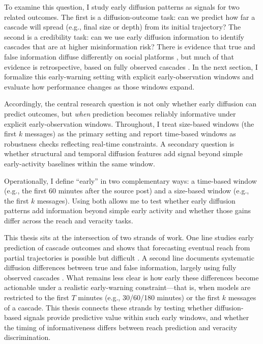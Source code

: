To examine this question, I study early diffusion patterns as signals for two related outcomes. The first is a diffusion-outcome task: can we predict how far a cascade will spread (e.g., final size or depth) from its initial trajectory? The second is a credibility task: can we use early diffusion information to identify cascades that are at higher misinformation risk? There is evidence that true and false information diffuse differently on social platforms \citep{vosoughi_spread_2018}, but much of that evidence is retrospective, based on fully observed cascades \citep{del_vicario_spreading_2016}. In the next section, I formalize this early-warning setting with explicit early-observation windows and evaluate how performance changes as those windows expand.


Accordingly, the central research question is not only whether early diffusion can predict outcomes, but \emph{when} prediction becomes reliably informative under explicit early-observation windows. Throughout, I treat size-based windows (the first $k$ messages) as the primary setting and report time-based windows as robustness checks reflecting real-time constraints. A secondary question is whether structural and temporal diffusion features add signal beyond simple early-activity baselines within the same window.

Operationally, I define “early” in two complementary ways: a time-based window (e.g., the first 60 minutes after the source post) and a size-based window (e.g., the first $k$ messages). Using both allows me to test whether early diffusion patterns add information beyond simple early activity and whether those gains differ across the reach and veracity tasks.

This thesis sits at the intersection of two strands of work. One line studies early prediction of cascade outcomes and shows that forecasting eventual reach from partial trajectories is possible but difficult \citep{cheng_can_2014,szabo_predicting_2010}. A second line documents systematic diffusion differences between true and false information, largely using fully observed cascades \citep{vosoughi_spread_2018}. What remains less clear is how early these differences become actionable under a realistic early-warning constraint---that is, when models are restricted to the first $T$ minutes (e.g., 30/60/180 minutes) or the first $k$ messages of a cascade. This thesis connects these strands by testing whether diffusion-based signals provide predictive value within such early windows, and whether the timing of informativeness differs between reach prediction and veracity discrimination.

